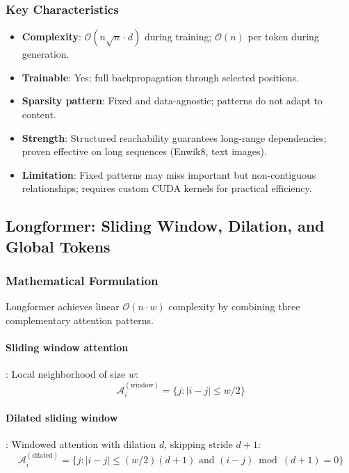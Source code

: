 \documentclass[11pt,a4paper]{article}
\begin{document}
\subsubsection{Key Characteristics}

\begin{itemize}[leftmargin=*]
    \item \textbf{Complexity}: $\mathcal{O}(n\sqrt{n} \cdot d)$ during training; $\mathcal{O}(n)$ per token during generation.
    \item \textbf{Trainable}: Yes; full backpropagation through selected positions.
    \item \textbf{Sparsity pattern}: Fixed and data-agnostic; patterns do not adapt to content.
    \item \textbf{Strength}: Structured reachability guarantees long-range dependencies; proven effective on long sequences (Enwik8, text images).
    \item \textbf{Limitation}: Fixed patterns may miss important but non-contiguous relationships; requires custom CUDA kernels for practical efficiency.
\end{itemize}

\subsection{Longformer: Sliding Window, Dilation, and Global Tokens}

\subsubsection{Mathematical Formulation}

Longformer \citep{beltagy_longformer_2020} achieves linear $\mathcal{O}(n \cdot w)$ complexity by combining three complementary attention patterns.

\paragraph{Sliding window attention}: Local neighborhood of size $w$:
\[
\mathcal{A}_i^{(\text{window})} = \{j : |i - j| \leq w/2\}
\]

\paragraph{Dilated sliding window}: Windowed attention with dilation $d$, skipping stride $d+1$:
\[
\mathcal{A}_i^{(\text{dilated})} = \{j : |i - j| \leq (w/2)(d+1) \text{ and } (i-j) \bmod (d+1) = 0\}
\]
\end{document}
